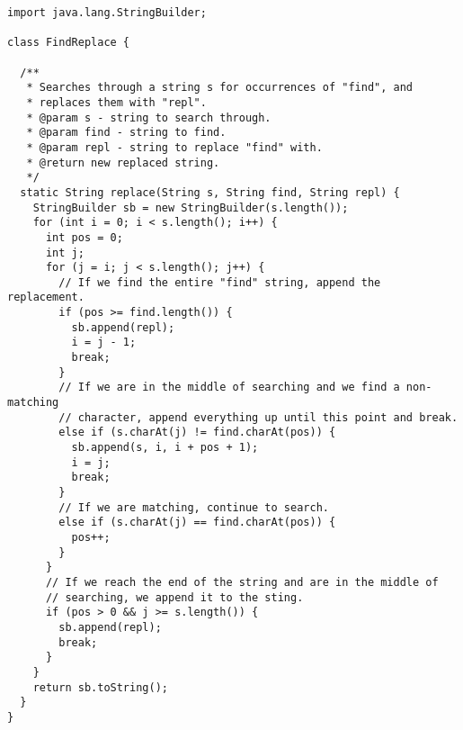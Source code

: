 \begin{lstlisting}[language=MyJava]
import java.lang.StringBuilder;

class FindReplace {

  /**
   * Searches through a string s for occurrences of "find", and
   * replaces them with "repl".
   * @param s - string to search through.
   * @param find - string to find.
   * @param repl - string to replace "find" with.
   * @return new replaced string.
   */
  static String replace(String s, String find, String repl) {
    StringBuilder sb = new StringBuilder(s.length());
    for (int i = 0; i < s.length(); i++) {
      int pos = 0;
      int j;
      for (j = i; j < s.length(); j++) {
        // If we find the entire "find" string, append the replacement.
        if (pos >= find.length()) {
          sb.append(repl);
          i = j - 1;
          break;
        }
        // If we are in the middle of searching and we find a non-matching
        // character, append everything up until this point and break.
        else if (s.charAt(j) != find.charAt(pos)) {
          sb.append(s, i, i + pos + 1);
          i = j;
          break;
        }
        // If we are matching, continue to search.
        else if (s.charAt(j) == find.charAt(pos)) {
          pos++;
        }
      }
      // If we reach the end of the string and are in the middle of
      // searching, we append it to the sting.
      if (pos > 0 && j >= s.length()) {
        sb.append(repl);
        break;
      }
    }
    return sb.toString();
  }
}
\end{lstlisting}



